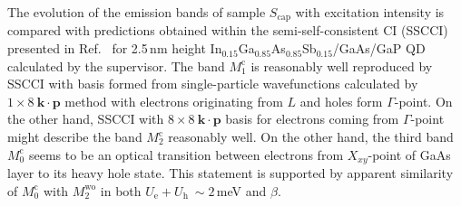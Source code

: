 		
%		
		


The evolution of the emission bands of sample $S_\mathrm{cap}$ with excitation intensity is compared with predictions obtained within the semi-self-consistent CI (SSCCI) presented in Ref.~\citep{Klenovsky2017} %
for 2.5$\,$nm height In$_{0.15}$Ga$_{0.85}$As$_{0.85}$Sb$_{0.15}$/GaAs/GaP QD calculated by the supervisor. The band $M_1^\mathrm{c}$ is reasonably well reproduced by SSCCI with basis formed from single-particle wavefunctions calculated by $1\times8~\mathbf{k \cdot p}$ method with electrons originating from $L$ and holes form $\Gamma$-point. On the other hand, SSCCI with $8\times8~\mathbf{k \cdot p}$ basis for electrons coming from $\Gamma$-point might describe the band $M_2^\mathrm{c}$ reasonably well. On the other hand, the third band $M_0^\mathrm{c}$ seems to be an optical transition between electrons from $X_{xy}$-point of GaAs layer to its heavy hole state. This statement is supported by apparent similarity of $M_0^\mathrm{c}$ with $M_2^\mathrm{wo}$ in both $U_\mathrm{e}+U_\mathrm{h}~\sim2$$\,$meV and $\beta$.

